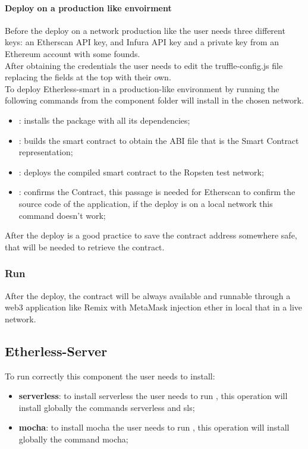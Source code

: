 \paragraph{Deploy on a production like envoirment}
Before the deploy on a network production like the user needs three different keys: an Etherscan API
key, and Infura API key and a private key from an Ethereum account with some founds.\\
After obtaining the credentials the user needs to edit the truffle-config.js file replacing the fields at the top with their own. \\
To deploy Etherless-smart in a production-like environment
by running the following commands from the component folder will install in the chosen network.
\begin{itemize}
    \item {} : installs the package with all its dependencies;
    \item {}: builds the smart contract to obtain the ABI file that is the Smart Contract representation;
    \item {}: deploys the compiled smart contract to the Ropsten test network;
    \item {}: confirms the Contract, this passage is needed for Etherscan to confirm the source code of the application, if the deploy is on a local network this command doesn't work;
\end{itemize}
After the deploy is a good practice to save the contract address somewhere safe, that will be needed to retrieve the contract.
\subsubsection{Run}
After the deploy, the contract will be always available and runnable through a web3 application like Remix with MetaMask injection ether in local that in a live network.
\subsection{Etherless-Server}
To run correctly this component the user needs to install:
\begin{itemize}
    \item \textbf{serverless}: to install serverless the user needs to run , this operation will install globally the commands serverless and sls;
    \item \textbf{mocha}: to install mocha the user needs to run , this operation will install globally the command mocha;
\end{itemize}
